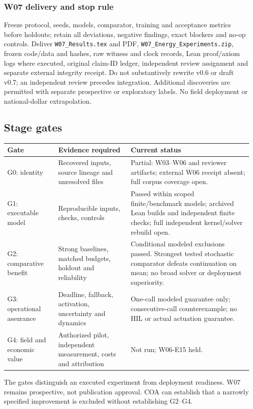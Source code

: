 \documentclass[11pt,letterpaper]{article}
\begin{document}
\subsubsection{W07 delivery and stop rule}
Freeze protocol, seeds, models, comparator, training and acceptance metrics before holdouts; retain all deviations, negative findings, exact blockers and no-op controls. Deliver \texttt{W07\_Results.tex} and PDF, \texttt{W07\_Energy\_Experiments.zip}, frozen code/data and hashes, raw witness and clock records, Lean proof/axiom logs where executed, original claim-ID ledger, independent review assignment and separate external integrity receipt. Do not substantively rewrite v0.6 or draft v0.7; an independent review precedes integration. Additional discoveries are permitted with separate prospective or exploratory labels. No field deployment or national-dollar extrapolation.

\subsection{Stage gates}
\begin{longtable}{P{.17\linewidth}P{.44\linewidth}P{.30\linewidth}}
\toprule Gate & Evidence required & Current status\\\midrule\endhead
G0: identity & Recovered inputs, source lineage and unresolved files & Partial: W03--W06 and reviewer artifacts; external W06 receipt absent; full corpus coverage open.\\
G1: executable model & Reproducible inputs, checks, controls & Passed within scoped finite/benchmark models; archived Lean builds and independent finite checks; full independent kernel/solver rebuild open.\\
G2: comparative benefit & Strong baselines, matched budgets, holdout and reliability & Conditional modeled exclusions passed. Strongest tested stochastic comparator defeats continuation on mean; no broad solver or deployment superiority.\\
G3: operational assurance & Deadline, fallback, activation, uncertainty and dynamics & One-call modeled guarantee only; consecutive-call counterexample; no HIL or actual actuation guarantee.\\
G4: field and economic value & Authorized pilot, independent measurement, costs and attribution & Not run; W06-E15 held.\\
\bottomrule
\end{longtable}
The gates distinguish an executed experiment from deployment readiness. W07 remains prospective, not publication approval. COA can establish that a narrowly specified improvement is excluded without establishing G2--G4.
\end{document}
